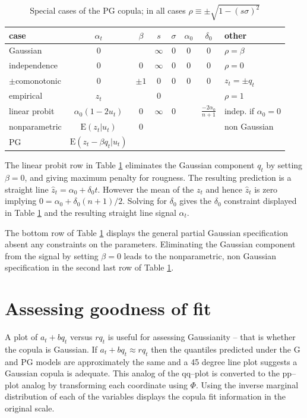 \documentclass[authoryear]{elsarticle}
\newcommand{\E}{\mathrm{E}}
\newcommand{\tref}[1]{Table \ref{#1}}
\begin{document}
 \begin{table}[htdp]
\caption{Special cases of the PG copula; in all cases $\rho\equiv\pm\sqrt{1-(s\sigma)^2}$}\label{pg}
\begin{center}
\begin{tabular}{l|c|ccccc|l}
\hline
case& $\alpha_t$ & $\beta$ &$s$ & $\sigma$ & $\alpha_0$&$\delta_0$  & other\\
\hline
Gaussian & 0 &  & $\infty$ & $0$&  0&0 &$\rho=\beta$\\
independence &  0 & 0 & $\infty$&0 & 0 &0 &$\rho=0$\\
$\pm$comonotonic  & 0 &$\pm 1$ &0 & 0 &0 & 0 &$z_t=\pm q_t$  \\
empirical  & $z_t$ &  & $0$  &  &   &  &$\rho=1$ \\ 
linear probit &$\alpha_0(1-2u_t)$&  0 &  $\infty$ &0& & $\frac{-2\alpha_0}{n+1}$ &indep. if $\alpha_0=0$\\
nonparametric & $\E(z_t|u_t)$  & 0 & & & &  & non Gaussian \\
PG & $\E(z_t-\beta q_t|u_t)$ & & & & & &  \\
\hline
\end{tabular}
\end{center}
\end{table}%

The linear probit row in \tref{pg}  eliminates the Gaussian component $q_t$ by setting $\beta=0$, and giving maximum penalty for rougness.   The resulting prediction  is a straight line $\hat z_t=\alpha_0+\delta_0 t$.  However the mean of the $z_t$ and hence $\hat z_t$ is zero implying $0=\alpha_0 + \delta_0(n+1)/2$.   Solving for $\delta_0$ gives the $\delta_0$ constraint displayed in \tref{pg} and the resulting straight line signal $\alpha_t$.

The bottom row of \tref{pg} displays the general partial Gaussian specification absent  any constraints on the parameters.  Eliminating the Gaussian component from the signal by setting $\beta=0$ leads to the nonparametric, non Gaussian specification in the second last row of \tref{pg}.

\section{Assessing goodness of fit}

A plot of $a_t+b q_t$ versus $r q_t$ is useful for assessing Gaussianity -- that is whether the copula  is Gaussian.   If $a_t+bq_t\approx rq_t$ then the quantiles predicted under the G and PG models are approximately the same and  a 45 degree line plot suggests a Gaussian copula is adequate.     This analog of the qq--plot is converted to the pp--plot analog  by transforming each coordinate using $\Phi$.   Using the inverse marginal distribution of each of the variables displays the copula fit information in the original scale. 
\end{document}
